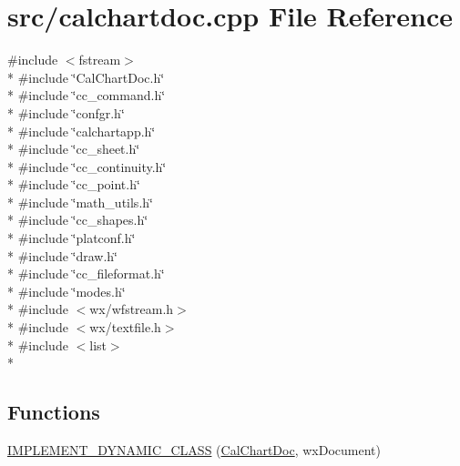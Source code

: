 \hypertarget{a00180}{\section{src/calchartdoc.cpp File Reference}
\label{a00180}
}
{\ttfamily \#include $<$fstream$>$}\\*
{\ttfamily \#include \char`\"{}Cal\-Chart\-Doc.\-h\char`\"{}}\\*
{\ttfamily \#include \char`\"{}cc\-\_\-command.\-h\char`\"{}}\\*
{\ttfamily \#include \char`\"{}confgr.\-h\char`\"{}}\\*
{\ttfamily \#include \char`\"{}calchartapp.\-h\char`\"{}}\\*
{\ttfamily \#include \char`\"{}cc\-\_\-sheet.\-h\char`\"{}}\\*
{\ttfamily \#include \char`\"{}cc\-\_\-continuity.\-h\char`\"{}}\\*
{\ttfamily \#include \char`\"{}cc\-\_\-point.\-h\char`\"{}}\\*
{\ttfamily \#include \char`\"{}math\-\_\-utils.\-h\char`\"{}}\\*
{\ttfamily \#include \char`\"{}cc\-\_\-shapes.\-h\char`\"{}}\\*
{\ttfamily \#include \char`\"{}platconf.\-h\char`\"{}}\\*
{\ttfamily \#include \char`\"{}draw.\-h\char`\"{}}\\*
{\ttfamily \#include \char`\"{}cc\-\_\-fileformat.\-h\char`\"{}}\\*
{\ttfamily \#include \char`\"{}modes.\-h\char`\"{}}\\*
{\ttfamily \#include $<$wx/wfstream.\-h$>$}\\*
{\ttfamily \#include $<$wx/textfile.\-h$>$}\\*
{\ttfamily \#include $<$list$>$}\\*
\subsection*{Functions}
\begin{DoxyCompactItemize}
\item 
\hyperlink{a00180_a08aa86cfbb8c28a3465214ba8464cb16}{I\-M\-P\-L\-E\-M\-E\-N\-T\-\_\-\-D\-Y\-N\-A\-M\-I\-C\-\_\-\-C\-L\-A\-S\-S} (\hyperlink{a00020}{Cal\-Chart\-Doc}, wx\-Document)
\end{DoxyCompactItemize}


